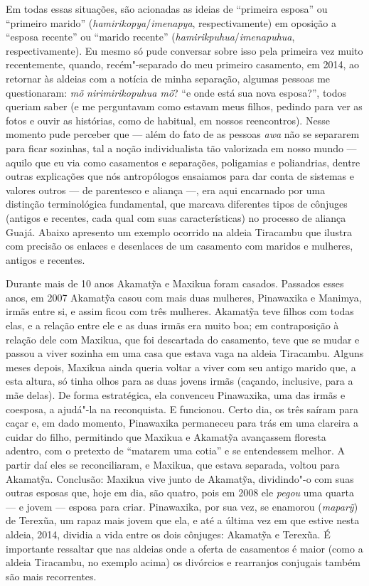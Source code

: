 Em todas essas situações, são acionadas as ideias de ``primeira esposa''
ou ``primeiro marido'' (\emph{hamirikopya}/\emph{imenapya},
respectivamente) em oposição a ``esposa recente'' ou ``marido recente''
(\emph{hamirikpuhua}/\emph{imenapuhua}, respectivamente). Eu mesmo só
pude conversar sobre isso pela primeira vez muito recentemente, quando,
recém"-separado do meu primeiro casamento, em 2014, ao retornar às
aldeias com a notícia de minha separação, algumas pessoas me
questionaram: \emph{mõ} \emph{nirimirikopuhua mõ}? ``e onde está sua
nova esposa?'', todos queriam saber (e me perguntavam como estavam meus
filhos, pedindo para ver as fotos e ouvir as histórias, como de
habitual, em nossos reencontros). Nesse momento pude perceber que --- além
do fato de as pessoas \emph{awa} não se separarem para ficar sozinhas,
tal a noção individualista tão valorizada em nosso mundo --- aquilo que eu
via como casamentos e separações, poligamias e poliandrias, dentre
outras explicações que nós antropólogos ensaiamos para dar conta de
sistemas e valores outros --- de parentesco e aliança ---, era aqui
encarnado por uma distinção terminológica fundamental, que marcava
diferentes tipos de cônjuges (antigos e recentes, cada qual com suas
características) no processo de aliança Guajá. Abaixo apresento um
exemplo ocorrido na aldeia Tiracambu que ilustra com precisão os enlaces
e desenlaces de um casamento com maridos e mulheres, antigos e recentes.

Durante mais de 10 anos Akamatỹa e Maxikua foram casados. Passados esses
anos, em 2007 Akamatỹa casou com mais duas mulheres, Pinawaxika e
Manimya, irmãs entre si, e assim ficou com três mulheres. Akamatỹa teve
filhos com todas elas, e a relação entre ele e as duas irmãs era muito
boa; em contraposição à relação dele com Maxikua, que foi descartada do
casamento, teve que se mudar e passou a viver sozinha em uma casa que
estava vaga na aldeia Tiracambu. Alguns meses depois, Maxikua ainda
queria voltar a viver com seu antigo marido que, a esta altura, só tinha
olhos para as duas jovens irmãs (caçando, inclusive, para a mãe delas).
De forma estratégica, ela convenceu Pinawaxika, uma das irmãs e
coesposa, a ajudá"-la na reconquista. E funcionou. Certo dia, os três
saíram para caçar e, em dado momento, Pinawaxika permaneceu para trás em
uma clareira a cuidar do filho, permitindo que Maxikua e Akamatỹa
avançassem floresta adentro, com o pretexto de ``matarem uma cotia'' e se
entendessem melhor. A partir daí eles se reconciliaram, e Maxikua, que
estava separada, voltou para Akamatỹa. Conclusão: Maxikua vive junto de
Akamatỹa, dividindo"-o com suas outras esposas que, hoje em dia, são
quatro, pois em 2008 ele \emph{pegou} uma quarta --- e jovem --- esposa para
criar. Pinawaxika, por sua vez, se enamorou (\emph{maparỹ}) de Terexũa,
um rapaz mais jovem que ela, e até a última vez em que estive nesta
aldeia, 2014, dividia a vida entre os dois cônjuges: Akamatỹa e Terexũa.
É importante ressaltar que nas aldeias onde a oferta de casamentos é
maior (como a aldeia Tiracambu, no exemplo acima) os divórcios e
rearranjos conjugais também são mais recorrentes.

